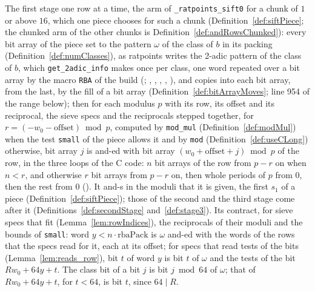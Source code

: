 \begin{definition}\label{def:andRows}
  \leanok
  The first stage one row at a time, the arm of \verb|_ratpoints_sift0| for a chunk of $1$ or above
  $16$, which one piece chooses for such a chunk (Definition~\ref{def:siftPiece}; the chunked arm of
  the other chunks is Definition~\ref{def:andRowsChunked}): every bit array of the piece set to the
  pattern $\omega$ of the class of $b$ in its packing (Definition~\ref{def:numClasses}), as
  ratpoints writes the 2-adic pattern of the class of $b$, which \verb|get_2adic_info| makes once
  per class, one word repeated over a bit array by the macro \verb|RBA| of the build
  (; ,
  , ,
  , ), and copies into each bit
  array, from the last, by the fill of a bit array (Definition~\ref{def:bitArrayMoves}; line 954 of
  the range below); then for each modulus $p$ with its row, its offset and its reciprocal, the sieve
  specs and the reciprocals stepped together, for $r = (-w_0 - \mathrm{offset}) \bmod p$, computed
  by \verb|mod_mul| (Definition~\ref{def:modMul}) when the test \verb|small| of the piece allows it
  and by \verb|mod| (Definition~\ref{def:useCLong}) otherwise, bit array $j$ is and-ed with bit
  array $(w_0 + \mathrm{offset} + j) \bmod p$ of the row, in the three loops of the C code: $n$ bit
  arrays of the row from $p - r$ on when $n < r$, and otherwise $r$ bit arrays from $p - r$ on, then
  whole periods of $p$ from $0$, then the rest from $0$ (). It and-s in
  the moduli that it is given, the first $s_1$ of a piece (Definition~\ref{def:siftPiece}); those of
  the second and the third stage come after it (Definitions~\ref{def:secondStage}
  and~\ref{def:stage3}). Its contract, for sieve specs that fit (Lemma~\ref{lem:rowIndices}), the
  reciprocals of their moduli and the bounds of \verb|small|: word $y < n \cdot \mathrm{rbaPack}$ is
  $\omega$ and-ed with the words of the rows that the specs read for it, each at its offset; for
  specs that read tests of the bits (Lemma~\ref{lem:reads_row}), bit $t$ of word $y$ is bit $t$ of
  $\omega$ and the tests of the bit $R w_0 + 64 y + t$. The class bit of a bit $j$ is bit
  $j \bmod 64$ of $\omega$; that of $R w_0 + 64 y + t$, for $t < 64$, is bit $t$, since $64 \mid R$.
\end{definition}

